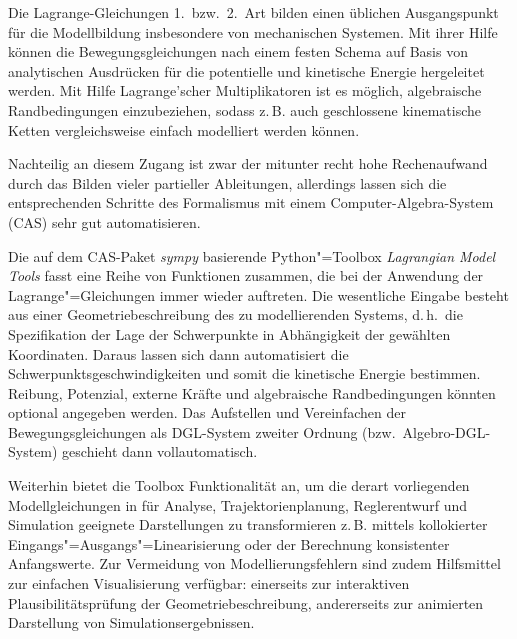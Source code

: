 \documentclass{gma}
\begin{document}
\erstautor{}

\maketitle
Die Lagrange-Gleichungen 1.\ bzw.\ 2.\ Art bilden einen üblichen Ausgangspunkt für die Modellbildung insbesondere von mechanischen Systemen. Mit ihrer Hilfe können die Bewegungsgleichungen nach einem festen Schema auf Basis von analytischen Ausdrücken für die potentielle und kinetische Energie hergeleitet werden. Mit Hilfe Lagrange'scher Multiplikatoren ist es möglich, algebraische Randbedingungen einzubeziehen, sodass z.\,B. auch geschlossene kinematische Ketten vergleichsweise einfach modelliert werden können.

Nachteilig an diesem Zugang ist zwar der mitunter recht hohe Rechenaufwand durch das Bilden vieler partieller Ableitungen, allerdings lassen sich die entsprechenden Schritte des Formalismus mit einem Computer-Algebra-System (CAS) sehr gut automatisieren.

Die auf dem CAS-Paket \textit{sympy} basierende Python"=Toolbox \textit{Lagrangian Model Tools} fasst eine Reihe von Funktionen zusammen, die bei der Anwendung der Lagrange"=Gleichungen immer wieder auftreten. Die wesentliche Eingabe besteht aus einer Geometriebeschreibung des zu modellierenden Systems, d.\,h.\ die Spezifikation der Lage der Schwerpunkte in Abhängigkeit der gewählten Koordinaten. Daraus lassen sich dann automatisiert die Schwerpunktsgeschwindigkeiten und somit die kinetische Energie bestimmen. Reibung, Potenzial, externe Kräfte und algebraische Randbedingungen könnten optional angegeben werden.
Das Aufstellen und Vereinfachen der Bewegungsgleichungen als DGL-System zweiter Ordnung (bzw.\ Algebro-DGL-System) geschieht dann vollautomatisch.

Weiterhin bietet die Toolbox Funktionalität an, um die derart vorliegenden Modellgleichungen in für Analyse, Trajektorienplanung, Reglerentwurf und Simulation geeignete Darstellungen zu transformieren z.\,B. mittels kollokierter Eingangs"=Ausgangs"=Linearisierung oder der Berechnung konsistenter Anfangswerte. Zur Vermeidung von Modellierungsfehlern sind zudem Hilfsmittel zur einfachen Visualisierung verfügbar: einerseits zur interaktiven Plausibilitätsprüfung der Geometriebeschreibung, andererseits zur animierten Darstellung von Simulationsergebnissen.




%
% 
\end{document}
